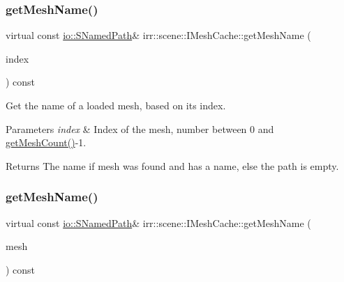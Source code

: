 \subsubsection{\texorpdfstring{get\+Mesh\+Name()}{getMeshName()}\hspace{0.1cm}{\footnotesize\ttfamily [2/4]}}
{\footnotesize\ttfamily virtual const \hyperlink{structirr_1_1io_1_1SNamedPath}{io\+::\+S\+Named\+Path}\& irr\+::scene\+::\+I\+Mesh\+Cache\+::get\+Mesh\+Name (\begin{DoxyParamCaption}\item[{\hyperlink{namespaceirr_a0416a53257075833e7002efd0a18e804}{u32}}]{index }\end{DoxyParamCaption}) const\hspace{0.3cm}{\ttfamily [pure virtual]}}



Get the name of a loaded mesh, based on its index. 


\begin{DoxyParams}{Parameters}
{\em index} & Index of the mesh, number between 0 and \hyperlink{classirr_1_1scene_1_1IMeshCache_a9dc99e46309a6ef494ef7672c9b49853}{get\+Mesh\+Count()}-\/1. \\
\hline
\end{DoxyParams}
\begin{DoxyReturn}{Returns}
The name if mesh was found and has a name, else the path is empty. 
\end{DoxyReturn}
\mbox{\label{classirr_1_1scene_1_1IMeshCache_a7271fa1247b8c1198c196dc947b5ede0}} 
\subsubsection{\texorpdfstring{get\+Mesh\+Name()}{getMeshName()}\hspace{0.1cm}{\footnotesize\ttfamily [3/4]}}
{\footnotesize\ttfamily virtual const \hyperlink{structirr_1_1io_1_1SNamedPath}{io\+::\+S\+Named\+Path}\& irr\+::scene\+::\+I\+Mesh\+Cache\+::get\+Mesh\+Name (\begin{DoxyParamCaption}\item[{const \hyperlink{classirr_1_1scene_1_1IMesh}{I\+Mesh} $\ast$const}]{mesh }\end{DoxyParamCaption}) const\hspace{0.3cm}{\ttfamily [pure virtual]}}



